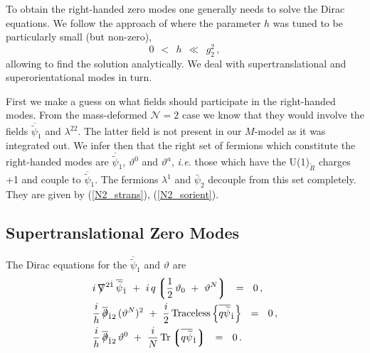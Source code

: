 \documentclass[12pt]{article}
\def\beq{\begin{equation}}
\def\eeq{\end{equation}}
\newcommand{\ntwo}{${\mathcal N}=2$ }
\newcommand{\p}{\partial}
\newcommand{\wt}{\widetilde}
\newcommand{\ov}{\overline}
\newcommand{\lgr}{\left\lgroup}
\newcommand{\rgr}{\right\rgroup}
\def\slashed#1{\setbox0=\hbox{$#1$}             %
   \dimen0=\wd0                                 %
   \setbox1=\hbox{/} \dimen1=\wd1               %
   \ifdim\dimen0>\dimen1                        %
      \rlap{\hbox to \dimen0{\hfil/\hfil}}      %
      #1                                        %
   \else                                        %
      \rlap{\hbox to \dimen1{\hfil$#1$\hfil}}   %
      /                                         %
   \fi}                                        %
\begin{document}
	To obtain the right-handed zero modes one generally needs to solve the Dirac equations.
	We follow the approach of \cite{GSYmmodel} where the parameter $ h $ was tuned to be particularly 
	small (but non-zero),
\beq
\label{smallh}
	0 ~~<~~ h ~~\ll~~ g_2^2\,,
\eeq
	allowing to find the solution analytically.
	We deal with supertranslational and superorientational modes in turn.

	First we make a guess on what fields should participate in the right-handed modes. 
	From the mass-deformed \ntwo case \cite{BSYhet} we know that they would involve
	the fields $ \ov{\wt{\psi}}{}_{\dot 1} $ and $ \lambda^{22} $.
	The latter field is not present in our $M$-model as it was integrated out.
	We infer then that the right set of fermions which constitute the right-handed modes
	are $ \ov{\wt{\psi}}{}_{\dot 1} $, $ \vartheta^0 $ and $ \vartheta^a $, {\it i.e.}
	those which have the U(1)$_{\wt R}$ charges +1 and couple to $ \ov{\wt{\psi}}{}_{\dot 1} $.
	The fermions $ \lambda^{1} $ and $\bar{\psi}_{\dot{2}}$
        decouple from this set completely. They are given by (\ref{N2_strans}), (\ref{N2_sorient}).

\subsection{Supertranslational Zero Modes}

	The Dirac equations for the $ \ov{\wt \psi}{}_{\dot 1} $ and $ \vartheta $ are
\begin{align*}
%
&
	i\, \slashed{\nabla}^{2\dot{1}}\, \ov{\wt\psi}{}_{\dot 1}  
		~+~  i\, q \lgr \frac{1}{2}\, \vartheta_0  ~+~ \vartheta^N \rgr ~~=~~ 0\,, \\
%
&
	\frac{i}{h}\, \ov{\slashed{\p}}{}_{\dot{1}2}\, (\vartheta^N)^2
		~+~ \frac{i}{2}\, {\rm Traceless} \left\{ \ov{q \wt{\psi}}{}_{\dot 1} \right\} ~~=~~ 0\,, \\
%
&
	\frac{i}{h}\, \ov{\slashed{\p}}_{\dot{1}2}\, \vartheta^0 
		~+~ \frac{i}{N}\, {\rm Tr} \lgr \ov{q \wt{\psi}}{}_{\dot 1} \rgr ~~=~~ 0\,.
\end{align*}
\end{document}
